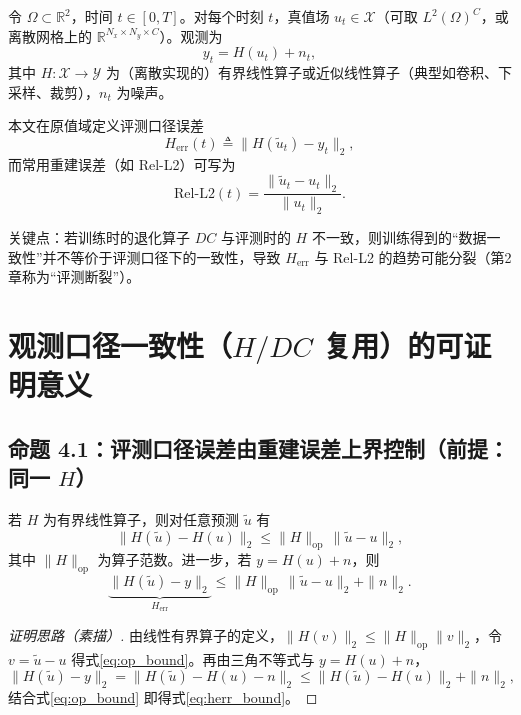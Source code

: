 令 $\Omega \subset \mathbb{R}^2$，时间 $t\in[0,T]$。对每个时刻 $t$，真值场 $u_t \in \mathcal{X}$（可取 $L^2(\Omega)^C$，或离散网格上的 $\mathbb{R}^{N_x\times N_y\times C}$）。观测为
\begin{equation}
y_t = H(u_t) + n_t,
\label{eq:obs}
\end{equation}
其中 $H:\mathcal{X}\to\mathcal{Y}$ 为（离散实现的）有界线性算子或近似线性算子（典型如卷积、下采样、裁剪），$n_t$ 为噪声。

本文在原值域定义评测口径误差
\begin{equation}
H_{\text{err}}(t)\triangleq \|H(\tilde u_t)-y_t\|_2,
\label{eq:herr}
\end{equation}
而常用重建误差（如 Rel-L2）可写为
\begin{equation}
\mathrm{Rel\text{-}L2}(t)=\frac{\|\tilde u_t-u_t\|_2}{\|u_t\|_2}.
\label{eq:rell2}
\end{equation}

关键点：若训练时的退化算子 $DC$ 与评测时的 $H$ 不一致，则训练得到的“数据一致性”并不等价于评测口径下的一致性，导致 $H_{\text{err}}$ 与 Rel-L2 的趋势可能分裂（第2章称为“评测断裂”）。

\section{观测口径一致性（\texorpdfstring{$H/DC$}{H/DC} 复用）的可证明意义}\label{sec:hdc_theory}

\subsection{命题 4.1：评测口径误差由重建误差上界控制（前提：同一 \texorpdfstring{$H$}{H}）}\label{sec:prop41}

\begin{proposition}[评测一致性上界]\label{prop:eval_bound}
若 $H$ 为有界线性算子，则对任意预测 $\tilde u$ 有
\begin{equation}
\|H(\tilde u)-H(u)\|_2 \le \|H\|_{\mathrm{op}}\,\|\tilde u-u\|_2,
\label{eq:op_bound}
\end{equation}
其中 $\|H\|_{\mathrm{op}}$ 为算子范数。进一步，若 $y=H(u)+n$，则
\begin{equation}
\underbrace{\|H(\tilde u)-y\|_2}_{H_{\mathrm{err}}}
\le
\|H\|_{\mathrm{op}}\,\|\tilde u-u\|_2 + \|n\|_2.
\label{eq:herr_bound}
\end{equation}
\end{proposition}

\begin{proof}[证明思路（素描）]
由线性有界算子的定义，$\|H(v)\|_2\le \|H\|_{\mathrm{op}}\|v\|_2$，令 $v=\tilde u-u$ 得式\eqref{eq:op_bound}。再由三角不等式与 $y=H(u)+n$，
\[
\|H(\tilde u)-y\|_2=\|H(\tilde u)-H(u)-n\|_2 \le \|H(\tilde u)-H(u)\|_2 + \|n\|_2,
\]
结合式\eqref{eq:op_bound} 即得式\eqref{eq:herr_bound}。
\end{proof}

